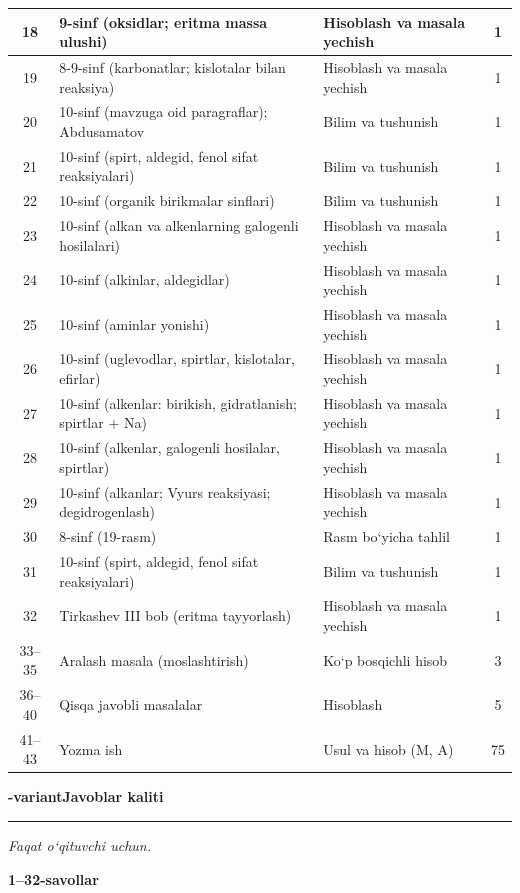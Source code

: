 \documentclass[11pt,a4paper]{article}
\newcommand{\hdrpill}[1]{\begin{tikzpicture}[baseline=0pt]\node[fill=ygreen,text=white,rounded corners=8pt,inner xsep=10pt,inner ysep=5pt,font=\fontsize{13}{15}\bfseries\selectfont] at (0,0.475){#1};\end{tikzpicture}}
\newcommand{\curvar}{}\fancyhead[R]{\hdrpill{\curvar}}
\begin{document}
{\begin{longtable}{|c|p{7.2cm}|p{5.4cm}|c|}
18 & 9-sinf (oksidlar; eritma massa ulushi) & Hisoblash va masala yechish & 1\\\hline
19 & 8-9-sinf (karbonatlar; kislotalar bilan reaksiya) & Hisoblash va masala yechish & 1\\\hline
20 & 10-sinf (mavzuga oid paragraflar); Abdusamatov & Bilim va tushunish & 1\\\hline
21 & 10-sinf (spirt, aldegid, fenol sifat reaksiyalari) & Bilim va tushunish & 1\\\hline
22 & 10-sinf (organik birikmalar sinflari) & Bilim va tushunish & 1\\\hline
23 & 10-sinf (alkan va alkenlarning galogenli hosilalari) & Hisoblash va masala yechish & 1\\\hline
24 & 10-sinf (alkinlar, aldegidlar) & Hisoblash va masala yechish & 1\\\hline
25 & 10-sinf (aminlar yonishi) & Hisoblash va masala yechish & 1\\\hline
26 & 10-sinf (uglevodlar, spirtlar, kislotalar, efirlar) & Hisoblash va masala yechish & 1\\\hline
27 & 10-sinf (alkenlar: birikish, gidratlanish; spirtlar + Na) & Hisoblash va masala yechish & 1\\\hline
28 & 10-sinf (alkenlar, galogenli hosilalar, spirtlar) & Hisoblash va masala yechish & 1\\\hline
29 & 10-sinf (alkanlar; Vyurs reaksiyasi; degidrogenlash) & Hisoblash va masala yechish & 1\\\hline
30 & 8-sinf (19-rasm) & Rasm bo`yicha tahlil & 1\\\hline
31 & 10-sinf (spirt, aldegid, fenol sifat reaksiyalari) & Bilim va tushunish & 1\\\hline
32 & Tirkashev III bob (eritma tayyorlash) & Hisoblash va masala yechish & 1\\\hline
33--35 & Aralash masala (moslashtirish) & Ko`p bosqichli hisob & 3\\\hline
36--40 & Qisqa javobli masalalar & Hisoblash & 5\\\hline
41--43 & Yozma ish & Usul va hisob (M, A) & 75\\\hline
\end{longtable}}
\renewcommand{\curvar}{Javoblar}
\newpage
\noindent\textbf{\fontsize{13}{15}-variant}\hfill \textbf{Javoblar kaliti}\par\smallskip\hrule\smallskip
\textit{Faqat o`qituvchi uchun.}\par\medskip
\noindent\textbf{1--32-savollar}\par\smallskip
\end{document}
